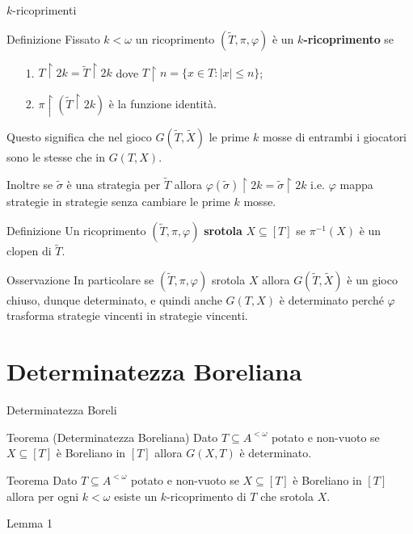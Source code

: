 \documentclass[aspectratio=43]{beamer}
\begin{document}
\begin{frame}{\(k\)-ricoprimenti}
  \begin{block}{Definizione}
    Fissato \(k < \omega\) un ricoprimento \((\tilde{T}, \pi, \varphi)\) è un \textbf{\(k\)-ricoprimento} se
    \begin{itemize}
    \item[1.] \(T \upharpoonright 2k = \tilde{T} \upharpoonright 2k\) dove \(T \upharpoonright n = \{x \in T : |x| \leq n\}\);
    \item[2.] \(\pi \upharpoonright (\tilde{T} \upharpoonright 2k)\) è la funzione identità.
    \end{itemize}
  \end{block}
  \pause
  \begin{block}{}
    Questo significa che nel gioco \(G(\tilde{T}, \tilde{X})\) le prime \(k\) mosse di entrambi i giocatori sono le stesse che in \(G(T, X)\).
  \end{block}
  \pause
  \begin{block}{}
    Inoltre se \(\tilde{\sigma}\) è una strategia per \(\tilde{T}\) allora \(\varphi(\tilde{\sigma}) \upharpoonright 2k = \tilde{\sigma} \upharpoonright 2k\) i.e. \(\varphi\) mappa strategie in strategie senza cambiare le prime \(k\) mosse.
  \end{block}
\end{frame}

\begin{frame}
  \begin{block}{Definizione}
    Un ricoprimento \((\tilde{T}, \pi, \varphi)\) \textbf{srotola} \(X \subseteq [T]\) se \(\pi^{-1}(X)\) è un clopen di \(\tilde{T}\).
  \end{block}
  \pause
  \begin{block}{Osservazione}
    In particolare se \((\tilde{T}, \pi, \varphi)\) srotola \(X\) allora \(G(\tilde{T}, \tilde{X})\) è un gioco chiuso, dunque determinato, e quindi anche \(G(T, X)\) è determinato perché \(\varphi\) trasforma strategie vincenti in strategie vincenti.
  \end{block}
\end{frame}

\section{Determinatezza Boreliana}

\begin{frame}{Determinatezza Boreli}
  \begin{block}{Teorema (Determinatezza Boreliana)}
    Dato \(T \subseteq A^{<\omega}\) potato e non-vuoto se \(X \subseteq [T]\) è Boreliano in \([T]\) allora \(G(X, T)\) è determinato.
  \end{block}
  \pause
  \begin{block}{Teorema}
    Dato \(T \subseteq A^{<\omega}\) potato e non-vuoto se \(X \subseteq [T]\) è Boreliano in \([T]\) allora per ogni \(k < \omega\) esiste un \(k\)-ricoprimento di \(T\) che srotola \(X\).
  \end{block}
\end{frame}

\begin{frame}
  \begin{block}{Lemma 1}
    
  \end{block}
\end{frame}
\end{document}
